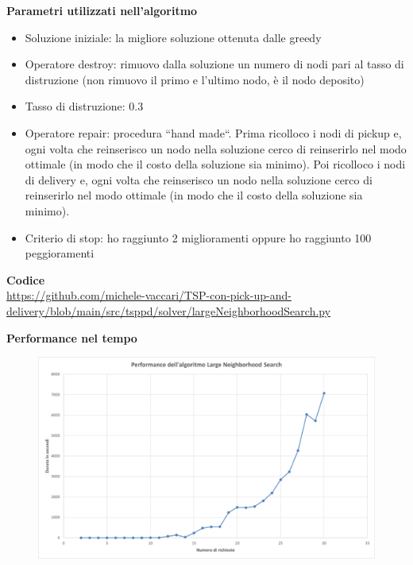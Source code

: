 \documentclass[9pt]{beamer}
\begin{document}
\begin{frame}{\subsecname}
	\textbf{Parametri utilizzati nell'algoritmo}
	\begin{itemize}
		\item
		Soluzione iniziale: la migliore soluzione ottenuta dalle greedy
		\item
		Operatore destroy: rimuovo dalla soluzione un numero di nodi pari al tasso di distruzione (non rimuovo il primo e l’ultimo nodo, è il nodo deposito)
		\item
		Tasso di distruzione: 0.3
		\item
		Operatore repair: procedura ``hand made``. Prima ricolloco i nodi di pickup e, ogni volta che reinserisco un nodo nella soluzione cerco di reinserirlo nel modo ottimale (in modo che il costo della soluzione sia minimo). Poi ricolloco i nodi di delivery e, ogni volta che reinserisco un nodo nella soluzione cerco di reinserirlo nel modo ottimale (in modo che il costo della soluzione sia minimo).
		\item
		Criterio di stop: ho raggiunto 2 miglioramenti oppure ho raggiunto 100 peggioramenti
	\end{itemize}

	\textbf{Codice} \\
	\href{https://github.com/michele-vaccari/TSP-con-pick-up-and-delivery/blob/main/src/tsppd/solver/largeNeighborhoodSearch.py}{https://github.com/michele-vaccari/TSP-con-pick-up-and-delivery/blob/main/src/tsppd/solver/largeNeighborhoodSearch.py}

\framebreak

	\textbf{Performance nel tempo}
      	\begin{figure}[h]
	\centering
	\includegraphics[width=\textwidth]
	{../charts/13 Performance dell'algoritmo Large Neighborhood Search}
	\end{figure}

\end{frame}
\end{document}
